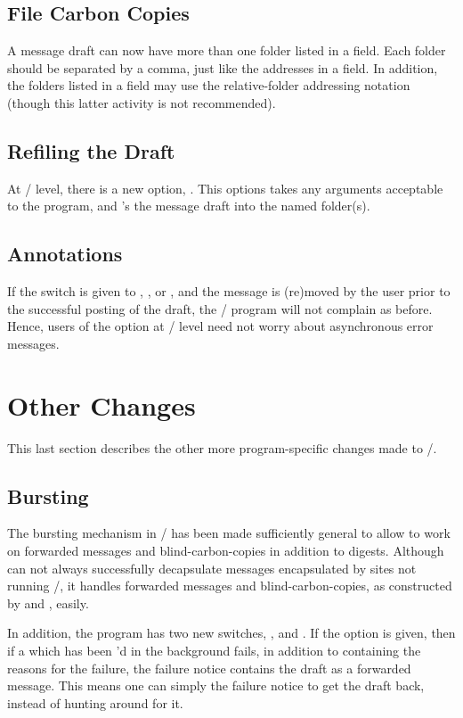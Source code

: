 \subsection{File Carbon Copies}
A message draft can now have more than one folder listed in a  field.
Each folder should be separated by a comma, just like the addresses in a
 field.
In addition, the folders listed in a  field may use the
relative-folder addressing notation
(though this latter activity is not recommended).

\subsection{Refiling the Draft}
At \whatnow/ level, there is a new option, .
This options takes any arguments acceptable to the  program,
and 's the message draft into the named folder(s).

\subsection{Annotations}
If the  switch is given to , , or
, and the message is (re)moved by the user prior to the successful
posting of the draft, the \MH/ program will not complain as before.
Hence, users of the  option at \whatnow/ level need not worry about
asynchronous error messages.

\section{Other Changes}
This last section describes the other more program-specific changes made to
\MH/.

\subsection{Bursting}
The bursting mechanism in \MH/ has been made sufficiently general to allow
 to work on forwarded messages and blind-carbon-copies in addition
to digests.
Although  can not always successfully decapsulate messages
encapsulated by sites not running \MH/,
it handles forwarded messages and blind-carbon-copies,
as constructed by  and , easily.

In addition, the  program has two new switches,
, and .
If the  option is given,
then if a  which has been 'd in the background fails,
in addition to containing the reasons for the failure,
the failure notice contains the draft as a forwarded message.
This means one can simply  the failure notice to get the draft
back,
instead of hunting around for it.


